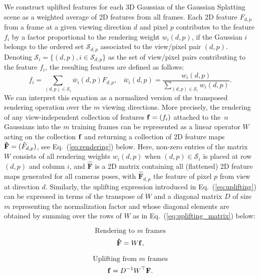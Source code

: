 We construct uplifted features for each 3D Gaussian of the Gaussian Splatting scene as a weighted average of 2D features from all frames. 
Each 2D feature $F_{d,p}$ from a frame at a given viewing direction $d$ and pixel $p$ contributes to the feature $f_i$ by a factor proportional to the rendering weight $w_{i}(d, p)$, if the Gaussian $i$ belongs to the ordered set $\mathcal{S}_{d,p}$ associated to the view/pixel pair $(d,p)$. Denoting $\mathcal{S}_i = \{(d,p), i\in \mathcal{S}_{d,p}\}$ as the set of view/pixel pairs contributing to the feature $f_i$, the resulting features are defined as follows: 
\begin{equation}
    \label{eq:uplifting}
    f_i =  \!\! \sum_{(d,p) \in \mathcal{S}_i}  \! \bar{w}_{i}(d, p) F_{d,p},  ~~\text{}~~  \bar{w}_i(d,p) = \frac{w_{i}(d, p)}{\sum_{(d,p) \in \mathcal{S}_i} \! w_{i}(d, p)}.
\end{equation}
We can interpret this equation as a normalized version of the transposed rendering operation over the $m$ viewing directions. 
More precisely, the rendering of any view-independent collection of features ${\bf{f}} = (f_i)$ attached to the~$n$ Gaussians into the $m$ training frames can be represented as a linear operator $W$ acting on the collection $\bf{f}$ and returning a collection of 2D feature maps ${\bf{\hat{F}}} = (\hat{F}_{d,p})$, see Eq.~(\ref{eq:rendering}) below.
Here, non-zero entries of the matrix $W$ consists of all rendering weights $w_{i}(d, p)$ when $(d,p) \in \mathcal{S}_i$ is placed at row $(d,p)$ and column $i$, and $\mathbf{\hat{F}}$ is a 2D matrix containing all (flattened) 2D feature maps generated for all cameras poses, with $\mathbf{\hat{F}}_{d,p}$ the feature of pixel $p$ from view at direction $d$.
Similarly, the uplifting expression introduced in Eq.~(\ref{eq:uplifting}) can be expressed in terms of the transpose of $W$ and a diagonal matrix $D$ of size $m$ representing the normalization factor and whose diagonal elements are obtained by summing over the rows of $W$ as in Eq.~(\ref{eq:uplifting_matrix}) below:

\vspace{-.2cm}
\begin{minipage}{0.2\textwidth}
\[
\text{Rendering to $m$ frames}
\]
\begin{equation}
    {\bf \hat{F}} = W{\bf{f}},
\label{eq:rendering}
\end{equation}
\end{minipage}
\hfill
\begin{minipage}{0.2\textwidth}
\[
\text{Uplifting from $m$ frames}
\]
\begin{equation}
    {\bf f} = D^{-1}W^{\top}{\bf{F}}.
\label{eq:uplifting_matrix}
\end{equation}
\end{minipage}
\vspace{.3cm}


